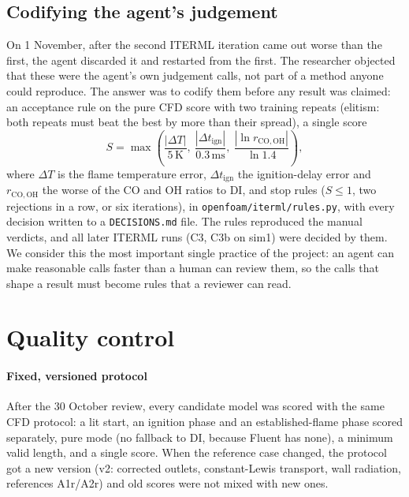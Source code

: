 \documentclass[preprint,review,12pt]{elsarticle}
\begin{document}
\subsection{Codifying the agent's judgement}
On 1 November, after the second ITERML iteration came out worse than the first, the agent discarded it and restarted
from the first. The researcher objected that these were the agent's own judgement calls, not part of a method anyone
could reproduce. The answer was to codify them before any result was claimed: an acceptance rule on the pure CFD score
with two training repeats (elitism: both repeats must beat the best by more than their spread), a single score
\begin{equation}
S=\max\left(\frac{|\Delta T|}{5\,\mathrm{K}},\ \frac{|\Delta t_\mathrm{ign}|}{0.3\,\mathrm{ms}},\
\frac{|\ln r_\mathrm{CO,OH}|}{\ln 1.4}\right),
\end{equation}
where $\Delta T$ is the flame temperature error, $\Delta t_\mathrm{ign}$ the ignition-delay error and
$r_\mathrm{CO,OH}$ the worse of the CO and OH ratios to DI, and stop
rules ($S\le 1$, two rejections in a row, or six iterations), in \texttt{openfoam/iterml/rules.py}, with every decision
written to a \texttt{DECISIONS.md} file. The rules reproduced the manual verdicts, and all later ITERML runs (C3, C3b on
sim1) were decided by them. We consider this the most important single practice of the project: an agent can make
reasonable calls faster than a human can review them, so the calls that shape a result must become rules that a
reviewer can read.

\section{Quality control}\label{sec:qc}

\paragraph{Fixed, versioned protocol} After the 30 October review, every candidate model was scored with the same CFD
protocol: a lit start, an ignition phase and an established-flame phase scored separately, pure mode (no fallback to
DI, because Fluent has none), a minimum valid length, and a single score. When the reference case changed, the
protocol got a new version (v2: corrected outlets, constant-Lewis transport, wall radiation, references A1r/A2r) and
old scores were not mixed with new ones.
\end{document}
